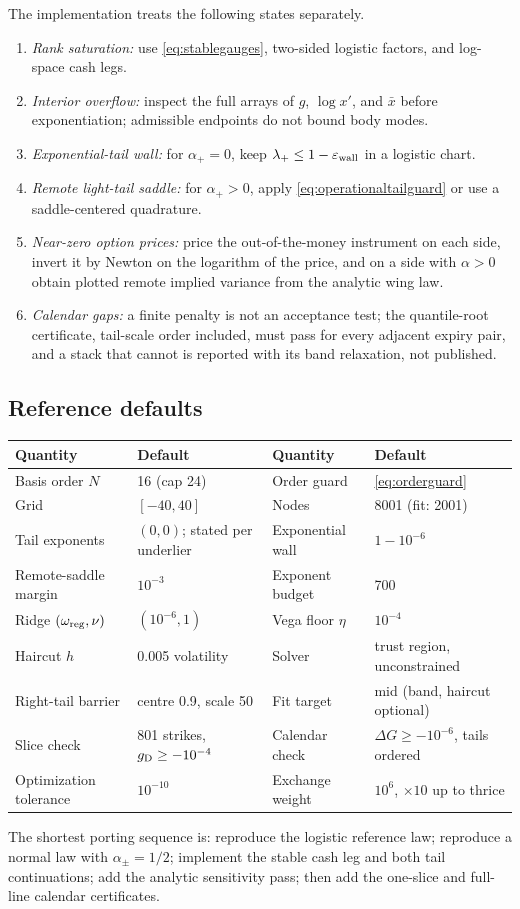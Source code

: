 The implementation treats the following states separately.
\begin{enumerate}
\item \emph{Rank saturation:} use \eqref{eq:stablegauges}, two-sided logistic
factors, and log-space cash legs.
\item \emph{Interior overflow:} inspect the full arrays of $g$, $\log x'$,
and $\bar x$ before exponentiation; admissible endpoints do not bound body
modes.
\item \emph{Exponential-tail wall:} for $\alpha_+=0$, keep
$\lambda_+\le1-\varepsilon_{\rm wall}$ in a logistic chart.
\item \emph{Remote light-tail saddle:} for $\alpha_+>0$, apply
\eqref{eq:operationaltailguard} or use a saddle-centered quadrature.
\item \emph{Near-zero option prices:} price the out-of-the-money
instrument on each side, invert it by Newton on the logarithm of the
price, and on a side with $\alpha>0$ obtain plotted remote implied
variance from the analytic wing law.
\item \emph{Calendar gaps:} a finite penalty is not an acceptance test; the
quantile-root certificate, tail-scale order included, must pass for
every adjacent expiry pair, and a stack that cannot is reported with
its band relaxation, not published.
\end{enumerate}

\subsection{Reference defaults}

\begin{center}
\small
\begin{tabular}{@{}llll@{}}
\toprule
Quantity & Default & Quantity & Default\\
\midrule
Basis order $N$ & 16 (cap 24) & Order guard & \eqref{eq:orderguard}\\
Grid & $[-40,40]$ & Nodes & 8001 (fit: 2001)\\
Tail exponents & $(0,0)$; stated per underlier & Exponential wall & $1-10^{-6}$\\
Remote-saddle margin & $10^{-3}$ & Exponent budget & 700\\
Ridge $(\omega_{\rm reg},\nu)$ & $(10^{-6},1)$ & Vega floor $\eta$ & $10^{-4}$\\
Haircut $h$ & 0.005 volatility & Solver & trust region, unconstrained\\
Right-tail barrier & centre 0.9, scale 50 & Fit target & mid (band, haircut optional)\\
Slice check & 801 strikes, $g_{\rm D}\ge-10^{-4}$ & Calendar check & $\Delta G\ge-10^{-6}$, tails ordered\\
Optimization tolerance & $10^{-10}$ & Exchange weight & $10^{6}$, $\times10$ up to thrice\\
\bottomrule
\end{tabular}
\label{tab:defaults}
\end{center}

The shortest porting sequence is: reproduce the logistic reference law;
reproduce a normal law with $\alpha_\pm=1/2$; implement the stable cash leg
and both tail continuations; add the analytic sensitivity pass; then add the
one-slice and full-line calendar certificates.
